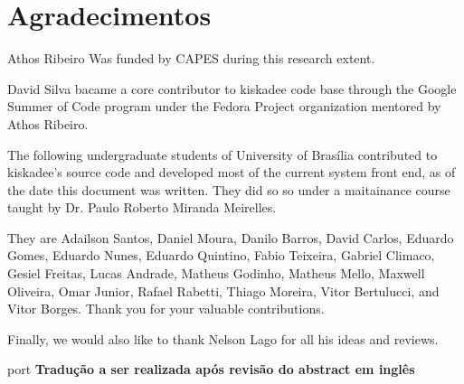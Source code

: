 \chapter*{Agradecimentos}

Athos Ribeiro Was funded by CAPES during this research extent.

David Silva bacame a core contributor to kiskadee code base through the Google
Summer of Code program under the Fedora Project organization mentored by Athos
Ribeiro.

The following undergraduate students of University of Brasília contributed to
kiskadee's source code and developed most of the current system front end, as of
the date this document was written. They did so so under a maitainance course
taught by Dr. Paulo Roberto Miranda Meirelles.

They are Adailson Santos,
Daniel Moura,
Danilo Barros,
David Carlos,
Eduardo Gomes,
Eduardo Nunes,
Eduardo Quintino,
Fabio Teixeira,
Gabriel Climaco,
Gesiel Freitas,
Lucas Andrade,
Matheus Godinho,
Matheus Mello,
Maxwell Oliveira,
Omar Junior,
Rafael Rabetti,
Thiago Moreira,
Vitor Bertulucci, and
Vitor Borges.
Thank you for your valuable contributions.

Finally, we would also like to thank Nelson Lago for all his ideas and reviews.

\begin{resumo}{port}
  \textbf{Tradução a ser realizada após revisão do abstract em inglês}
\end{resumo}

